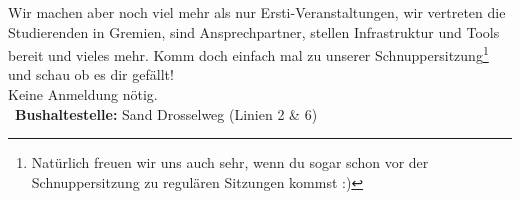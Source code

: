 \begin{description}
        Wir machen aber noch viel mehr als nur Ersti-Veranstaltungen, wir vertreten die Studierenden in Gremien,
        sind Ansprechpartner, stellen Infrastruktur und Tools bereit und vieles mehr.
        Komm doch einfach mal zu unserer Schnuppersitzung\footnote{Natürlich freuen wir uns auch sehr, wenn du sogar schon vor der Schnuppersitzung zu regulären Sitzungen kommst :)}
        und schau ob es dir gefällt!\\
        Keine Anmeldung nötig.\\
        ~\textbf{Bushaltestelle:} Sand Drosselweg (Linien 2 \& 6)
    \fi
\fi










\end{description}
